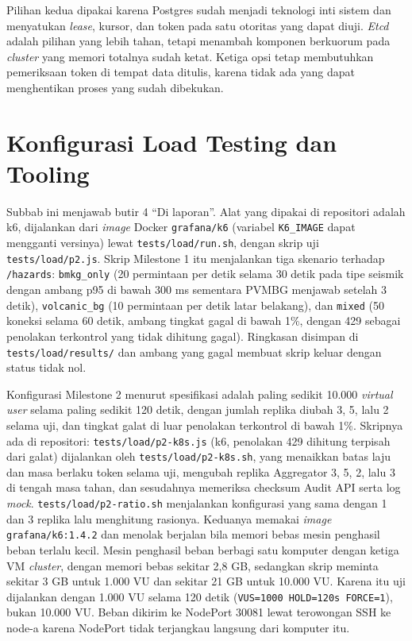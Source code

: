 Pilihan kedua dipakai karena Postgres sudah menjadi teknologi inti sistem dan menyatukan \textit{lease}, kursor, dan token pada satu otoritas yang dapat diuji. \textit{Etcd} adalah pilihan yang lebih tahan, tetapi menambah komponen berkuorum pada \textit{cluster} yang memori totalnya sudah ketat. Ketiga opsi tetap membutuhkan pemeriksaan token di tempat data ditulis, karena tidak ada yang dapat menghentikan proses yang sudah dibekukan.

\section{Konfigurasi Load Testing dan Tooling}

Subbab ini menjawab butir 4 ``Di laporan''. Alat yang dipakai di repositori adalah k6, dijalankan dari \textit{image} Docker \texttt{grafana/k6} (variabel \texttt{K6\_IMAGE} dapat mengganti versinya) lewat \texttt{tests/load/run.sh}, dengan skrip uji \texttt{tests/load/p2.js}. Skrip Milestone 1 itu menjalankan tiga skenario terhadap \texttt{/hazards}: \texttt{bmkg\_only} (20 permintaan per detik selama 30 detik pada tipe seismik dengan ambang p95 di bawah 300 ms sementara PVMBG menjawab setelah 3 detik), \texttt{volcanic\_bg} (10 permintaan per detik latar belakang), dan \texttt{mixed} (50 koneksi selama 60 detik, ambang tingkat gagal di bawah 1\%, dengan 429 sebagai penolakan terkontrol yang tidak dihitung gagal). Ringkasan disimpan di \texttt{tests/load/results/} dan ambang yang gagal membuat skrip keluar dengan status tidak nol.

Konfigurasi Milestone 2 menurut spesifikasi adalah paling sedikit 10.000 \textit{virtual user} selama paling sedikit 120 detik, dengan jumlah replika diubah 3, 5, lalu 2 selama uji, dan tingkat galat di luar penolakan terkontrol di bawah 1\%. Skripnya ada di repositori: \texttt{tests/load/p2-k8s.js} (k6, penolakan 429 dihitung terpisah dari galat) dijalankan oleh \texttt{tests/load/p2-k8s.sh}, yang menaikkan batas laju dan masa berlaku token selama uji, mengubah replika Aggregator 3, 5, 2, lalu 3 di tengah masa tahan, dan sesudahnya memeriksa checksum Audit API serta log \textit{mock}. \texttt{tests/load/p2-ratio.sh} menjalankan konfigurasi yang sama dengan 1 dan 3 replika lalu menghitung rasionya. Keduanya memakai \textit{image} \texttt{grafana/k6:1.4.2} dan menolak berjalan bila memori bebas mesin penghasil beban terlalu kecil. Mesin penghasil beban berbagi satu komputer dengan ketiga VM \textit{cluster}, dengan memori bebas sekitar 2,8 GB, sedangkan skrip meminta sekitar 3 GB untuk 1.000 VU dan sekitar 21 GB untuk 10.000 VU. Karena itu uji dijalankan dengan 1.000 VU selama 120 detik (\texttt{VUS=1000 HOLD=120s FORCE=1}), bukan 10.000 VU. Beban dikirim ke NodePort 30081 lewat terowongan SSH ke node-a karena NodePort tidak terjangkau langsung dari komputer itu.

